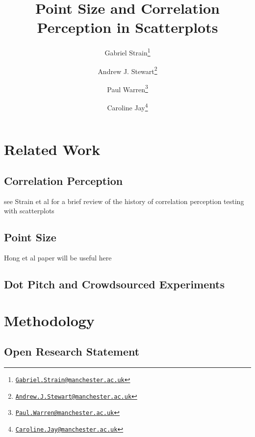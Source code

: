 \documentclass{vgtc}                          %
\title{Point Size and Correlation Perception in Scatterplots}
\author{Gabriel Strain\thanks{\href{mailto:Gabriel.Strain@manchester.ac.uk}{\nolinkurl{Gabriel.Strain@manchester.ac.uk}}} %
\and Andrew J. Stewart\thanks{\href{mailto:Andrew.J.Stewart@manchester.ac.uk}{\nolinkurl{Andrew.J.Stewart@manchester.ac.uk}}} %
\and Paul Warren\thanks{\href{mailto:Paul.Warren@manchester.ac.uk}{\nolinkurl{Paul.Warren@manchester.ac.uk}}} %
\and Caroline Jay\thanks{\href{mailto:Caroline.Jay@manchester.ac.uk}{\nolinkurl{Caroline.Jay@manchester.ac.uk}}}} %
\affiliation{\scriptsize The University of Manchester}
\begin{document}


\maketitle

\hypertarget{related-work}{%
\section{Related Work}\label{related-work}}

\hypertarget{correlation-perception}{%
\subsection{Correlation Perception}\label{correlation-perception}}

see Strain et al for a brief review of the history of correlation perception
testing with scatterplots

\hypertarget{point-size}{%
\subsection{Point Size}\label{point-size}}

Hong et al paper will be useful here

\hypertarget{dot-pitch-and-crowdsourced-experiments}{%
\subsection{Dot Pitch and Crowdsourced Experiments}\label{dot-pitch-and-crowdsourced-experiments}}

\hypertarget{methodology}{%
\section{Methodology}\label{methodology}}

\hypertarget{open-research-statement}{%
\subsection{Open Research Statement}\label{open-research-statement}}
\end{document}

